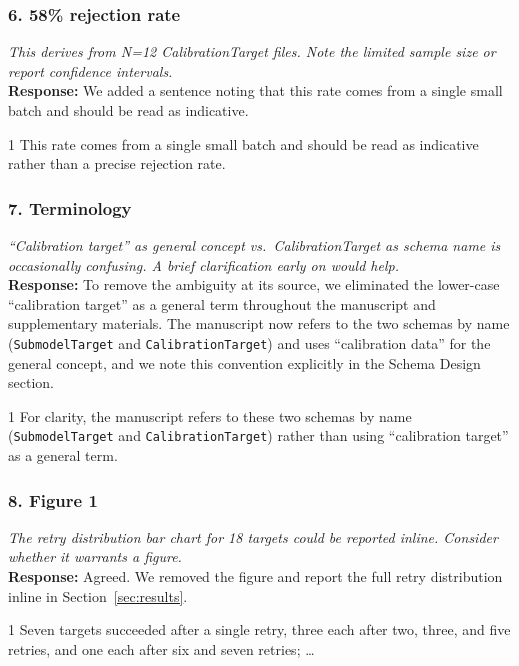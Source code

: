 \documentclass[11pt]{article}
\newcommand{\reviewer}[1]{\textcolor{reviewercolor}{\textit{#1}}}
\newcommand{\response}[1]{\textcolor{responsecolor}{\textbf{Response:} #1}}
\providecommand{\trackchanges}{1}
\newenvironment{revised}{\if1\trackchanges\color{blue}\fi}{}
\begin{document}
\subsubsection*{6. 58\% rejection rate}
\reviewer{This derives from N=12 CalibrationTarget files. Note the limited sample size or report confidence intervals.}\\
\response{We added a sentence noting that this rate comes from a single small batch and should be read as indicative.}

\begin{revised}
This rate comes from a single small batch and should be read as indicative rather than a precise rejection rate.
\end{revised}

\subsubsection*{7. Terminology}
\reviewer{``Calibration target'' as general concept vs.\ CalibrationTarget as schema name is occasionally confusing. A brief clarification early on would help.}\\
\response{To remove the ambiguity at its source, we eliminated the lower-case ``calibration target'' as a general term throughout the manuscript and supplementary materials. The manuscript now refers to the two schemas by name (\texttt{SubmodelTarget} and \texttt{CalibrationTarget}) and uses ``calibration data'' for the general concept, and we note this convention explicitly in the Schema Design section.}

\begin{revised}
For clarity, the manuscript refers to these two schemas by name (\texttt{SubmodelTarget} and \texttt{CalibrationTarget}) rather than using ``calibration target'' as a general term.
\end{revised}

\subsubsection*{8. Figure 1}
\reviewer{The retry distribution bar chart for 18 targets could be reported inline. Consider whether it warrants a figure.}\\
\response{Agreed. We removed the figure and report the full retry distribution inline in Section~\ref{sec:results}.}

\begin{revised}
Seven targets succeeded after a single retry, three each after two, three, and five retries, and one each after six and seven retries; \ldots
\end{revised}
\end{document}
